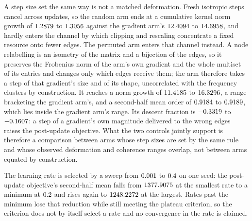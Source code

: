 \documentclass{article}
\begin{document}
A step size set the same way is not a matched deformation. Fresh isotropic
steps cancel across updates, so the random arm ends at a cumulative kernel norm growth of
$1.2879$ to $1.3056$ against the
gradient arm's $12.4094$ to $14.6958$, and
hardly enters the channel by which clipping and rescaling concentrate a fixed
resource onto fewer edges. The permuted arm enters that channel instead.
A node relabelling is an isometry of the matrix and a bijection of the edges, so
it preserves the Frobenius norm of the arm's own gradient and the whole multiset
of its entries and changes only which edges receive them; the arm therefore
takes a step of that gradient's size and of its shape, uncorrelated with the
frequency clusters by construction. It reaches a norm growth of $11.4185$ to
$16.3296$, a range bracketing the gradient arm's, and a
second-half mean order of $0.9184$ to
$0.9189$, which lies inside the gradient arm's range. Its
descent fraction is
$-0.3319$ to $-0.1607$: a step of
a gradient's own magnitude delivered to the wrong edges raises the post-update
objective. What the two controls jointly support is therefore a comparison
between arms whose step sizes are set by the same rule and whose observed
deformation and coherence ranges overlap, not between arms equated by
construction.

The learning rate is selected by a sweep from $0.001$ to
$0.4$ on one seed:
the post-update objective's second-half mean falls from
$1377.9075$ at the smallest rate to a minimum at
$0.2$ and rises again to
$1248.2272$ at the largest. Rates past the minimum lose
that reduction while still meeting the plateau criterion, so the criterion does
not by itself select a rate and no convergence in the rate is claimed.
\end{document}
